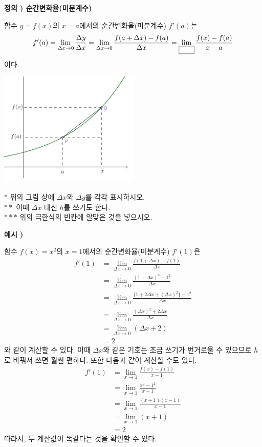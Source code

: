 \documentclass{oblivoir}
\newcounter{num}
\newcommand\defi[1]
{\bigskip\par\noindent\stepcounter{num} \textbf{정의 \thenum) #1}\par\noindent}
\newcommand\exam[1]
{\bigskip\par\noindent\stepcounter{num} \textbf{예시 \thenum) #1}\par\noindent}
\newcommand\pb[1]{\ensuremath{\fbox{\phantom{#1}}}}
\let\emph\textsf
\begin{document}
\begin{mdframed}
%
\defi{순간변화율(미분계수)}
함수 \(y=f(x)\)의 \(x=a\)에서의 \emph{순간변화율(미분계수)} \(f'(a)\)는
\[f'(a)=\lim_{\Delta x\to0}\frac{\Delta y}{\Delta x}=\lim_{\Delta x\to0}\frac{f(a+\Delta x)-f(a)}{\Delta x}=\lim_{\pb{aaa}}\frac{f(x)-f(a)}{x-a}\]
이다.
\begin{center}
\includegraphics[width=0.5\textwidth]{differential_coefficient}
\end{center}
\end{mdframed}
\(*\) 위의 그림 상에 \(\Delta x\)와 \(\Delta y\)를 각각 표시하시오.\\
\(**\) 이때 \(\Delta x\) 대신 \(h\)를 쓰기도 한다.\\
\(***\) 위의 극한식의 빈칸에 알맞은 것을 넣으시오.
\bigskip

%
\exam{}
함수 \(f(x)=x^2\)의 \(x=1\)에서의 순간변화율(미분계수) \(f'(1)\)은
\begin{align*}
f'(1)
&=\lim_{\Delta x\to0}\frac{f(1+\Delta x)-f(1)}{\Delta x}\\
&=\lim_{\Delta x\to0}\frac{(1+\Delta x)^2-1^2}{\Delta x}\\
&=\lim_{\Delta x\to0}\frac{\{1+2\Delta x+(\Delta x)^2\}-1^2}{\Delta x}\\
&=\lim_{\Delta x\to0}\frac{(\Delta x)^2+2\Delta x}{\Delta x}\\
&=\lim_{\Delta x\to0}\left(\Delta x+2\right)\\
&=2
\end{align*}
와 같이 계산할 수 있다.
이때 \(\Delta x\)와 같은 기호는 조금 쓰기가 번거로울 수 있으므로 \(h\)로 바꿔서 쓰면 훨씬 편하다.
또한 다음과 같이 계산할 수도 있다.
\begin{align*}
f'(1)
&=\lim_{x\to1}\frac{f(x)-f(1)}{x-1}\\
&=\lim_{x\to1}\frac{x^2-1^2}{x-1}\\
&=\lim_{x\to1}\frac{(x+1)(x-1)}{x-1}\\
&=\lim_{x\to1}(x+1)\\
&=2
\end{align*}
따라서, 두 계산값이 똑같다는 것을 확인할 수 있다.
\end{document}
